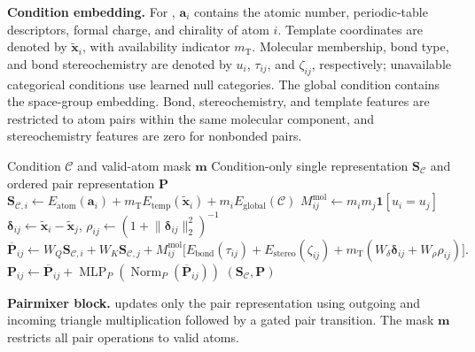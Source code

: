 \textbf{Condition embedding.} For , $\mathbf a_i$ contains the atomic number, periodic-table descriptors, formal charge, and chirality of atom $i$. Template coordinates are denoted by $\widetilde{\mathbf x}_i$, with availability indicator $m_{\mathrm T}$. Molecular membership, bond type, and bond stereochemistry are denoted by $u_i$, $\tau_{ij}$, and $\zeta_{ij}$, respectively; unavailable categorical conditions use learned null categories. The global condition contains the space-group embedding. Bond, stereochemistry, and template features are restricted to atom pairs within the same molecular component, and stereochemistry features are zero for nonbonded pairs.

\begin{algorithm}[H]
\caption{Condition embedding}
\label{alg:condition-embedding}
\begin{algorithmic}[1]
\Require Condition $\mathcal C$ and valid-atom mask $\mathbf m$
\Ensure Condition-only single representation $\mathbf S_{\mathcal C}$ and
ordered pair representation $\mathbf P$
\State $\displaystyle
\mathbf S_{\mathcal C,i}\gets
E_{\mathrm{atom}}(\mathbf a_i)
+m_{\mathrm T}E_{\mathrm{temp}}(\widetilde{\mathbf x}_i)
+m_iE_{\mathrm{global}}(\mathcal C)$
\Statex
{}
\State $M^{\mathrm{mol}}_{ij}\gets m_i m_j\mathbf 1[u_i=u_j]$
\State $\boldsymbol\delta_{ij}
    \gets\widetilde{\mathbf x}_i-\widetilde{\mathbf x}_j$,
    $\rho_{ij}\gets(1+\lVert\boldsymbol\delta_{ij}\rVert_2^2)^{-1}$
\Statex $\displaystyle \overline{\mathbf P}_{ij}\gets W_Q\mathbf S_{\mathcal C,i}+W_K\mathbf S_{\mathcal C,j}+M^{\mathrm{mol}}_{ij}\bigl[E_{\mathrm{bond}}(\tau_{ij})+E_{\mathrm{stereo}}(\zeta_{ij})+m_{\mathrm T}(W_\delta\boldsymbol\delta_{ij}+W_\rho\rho_{ij})\bigr].$
\Statex
{}
\State $\mathbf P_{ij}\gets\overline{\mathbf P}_{ij}
    +\operatorname{MLP}_{P}\!\left(
    \operatorname{Norm}_{P}(\overline{\mathbf P}_{ij})\right)$
\State \Return $(\mathbf S_{\mathcal C},\mathbf P)$
\end{algorithmic}
\end{algorithm}

\textbf{Pairmixer block.}  updates only the pair representation using outgoing and incoming triangle multiplication followed by a gated pair transition. The mask $\mathbf m$ restricts all pair operations to valid atoms.

